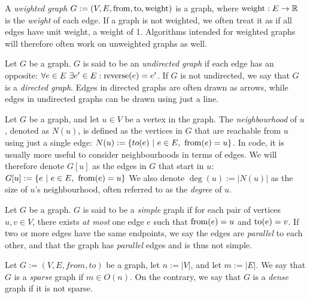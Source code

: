 \begin{definition}
    A \emph{weighted graph} $G := (V, E, \operatorname{from}, \operatorname{to}, \operatorname{weight})$ is a graph, where $\operatorname{weight} : E \rightarrow \mathbb{R}$ is the \emph{weight} of each edge. If a graph is not weighted, we often treat it as if all edges have unit weight, a weight of 1. Algorithms intended for weighted graphs will therefore often work on unweighted graphs as well.
\end{definition}

\begin{definition}
    Let $G$ be a graph. $G$ is said to be an \emph{undirected graph} if each edge has an opposite: $\forall e \in E ~ \exists e' \in E : \operatorname{reverse}(e) = e'$.
    If $G$ is not undirected, we say that $G$ is a \emph{directed graph}.
    Edges in directed graphs are often drawn as arrows, while edges in undirected graphs can be drawn using just a line.
\end{definition}

\begin{definition}[Neighbourhood]
    Let $G$ be a graph, and let $u \in V$ be a vertex in the graph. The \emph{neighbourhood} of $u$, denoted as $N(u)$, is defined as the vertices in $G$ that are reachable from $u$ using just a single edge: $N(u) := \{ to(e)  ~|~  e \in E, ~ \operatorname{from}(e) = u\}$. 
    In code, it is usually more useful to consider neighbourhoods in terms of edges. We will therefore denote $G[u]$ as the edges in $G$ that start in $u$: $G[u] := \{e ~ | ~ e \in E, ~ \operatorname{from}(e) = u\}$
    We also denote $\deg(u) := |N(u)|$ as the size of $u$'s neighbourhood, often referred to as the \emph{degree} of $u$.
\end{definition}

\begin{definition}
    Let $G$ be a graph. $G$ is said to be a \emph{simple} graph if for each pair of vertices $u,v \in V$, there exists \emph{at most} one edge $e$ such that $\operatorname{from}(e) = u$ and $\operatorname{to}(e) = v$. If two or more edges have the same endpoints, we say the edges are \emph{parallel} to each other, and that the graph has \emph{parallel} edges and is thus not simple.
\end{definition}

\begin{definition}
    Let $G := (V, E, from, to)$ be a graph, let $n := |V|$, and let $m := |E|$. We say that $G$ is a \emph{sparse} graph if $m \in O(n)$. On the contrary, we say that $G$ is a \emph{dense} graph if it is not sparse.
\end{definition}

